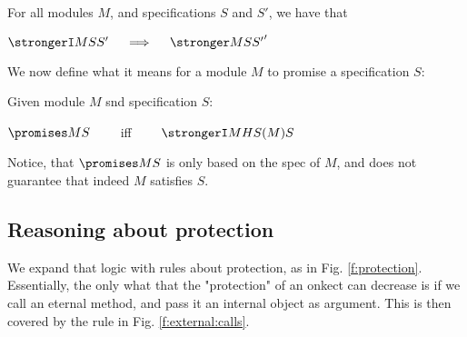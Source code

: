 \begin{lemma}
For all modules $M$, and specifications $S$ and $S'$, we have that\\
\strut \hspace{2cm} $\strongerI M  S  {S'}    \ \ \ \ \Longrightarrow\ \ \ \ \stronger M S {S'}'$
\end{lemma}

We now define what it means for a module $M$ to promise a specification $S$:

\begin{definition}
Given module $M$ snd specification $S$:

\strut \hspace{2cm} $\promises M S$ \ \ \ \  iff \ \ \ \  $\strongerI M {HS(M)} S$
\end{definition}

Notice, that $\promises M S$ is only based on the spec of $M$, and does not guarantee that indeed $M$ satisfies $S$.

% 
%
%
%
 


\subsection{Reasoning about protection}
We expand that logic with rules about protection, as in Fig. \ref{f:protection}. Essentially, the only what that the "protection" of an onkect can decrease is if we call an eternal method, and pass it an internal object as argument. This is then covered by the rule in Fig. \ref{f:external:calls}.


